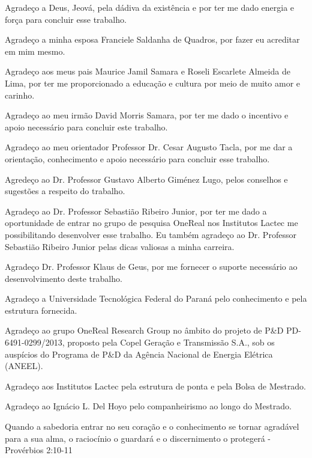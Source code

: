\documentclass[openright]{normas-utf-tex} %
\begin{document}
\begin{agradecimentos}
Agradeço a Deus, Jeová, pela dádiva da existência e por ter me dado energia e força para concluir esse trabalho.  

Agradeço a minha esposa Franciele Saldanha de Quadros, por fazer eu acreditar em mim mesmo. 

Agradeço aos meus pais Maurice Jamil Samara e Roseli Escarlete Almeida de Lima, por ter me proporcionado a educação e cultura por meio de muito amor e carinho.

Agradeço ao meu irmão David Morris Samara, por ter me dado o incentivo e apoio necessário para concluir este trabalho.

Agradeço ao meu orientador Professor Dr. Cesar Augusto Tacla, por me dar a orientação, conhecimento e apoio necessário para concluir esse trabalho. 

Agredeço ao Dr. Professor Gustavo Alberto Giménez Lugo, pelos conselhos e sugestões a respeito do trabalho. 

Agradeço ao Dr. Professor Sebastião Ribeiro Junior, por ter me dado a oportunidade de entrar no grupo de pesquisa OneReal nos Institutos Lactec me possibilitando desenvolver esse trabalho. Eu também agradeço ao Dr. Professor Sebastião Ribeiro Junior pelas dicas valiosas a minha carreira. 

Agradeço Dr. Professor Klaus de Geus, por me fornecer o suporte necessário ao desenvolvimento deste trabalho.  

Agradeço a Universidade Tecnológica Federal do Paraná pelo conhecimento e pela estrutura fornecida.

Agradeço ao grupo OneReal Research Group no âmbito do projeto de P\&D PD-6491-0299/2013, proposto pela Copel Geração e Transmissão S.A., sob os auspícios do Programa de P\&D da Agência Nacional de Energia Elétrica (ANEEL).

Agradeço aos Institutos Lactec pela estrutura de ponta e pela Bolsa de Mestrado.

Agradeço ao Ignácio L. Del Hoyo pelo companheirismo ao longo do Mestrado. 
\end{agradecimentos}

\begin{epigrafe}
Quando a sabedoria entrar no seu coração e o conhecimento se tornar agradável para a sua alma, o raciocínio o guardará e o discernimento o protegerá - Provérbios 2:10-11
\end{epigrafe}
\end{document}
